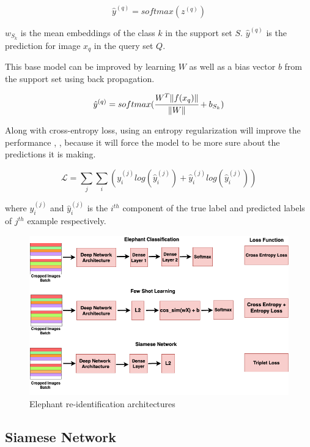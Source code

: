 \documentclass[10pt,twocolumn,letterpaper]{article}
\begin{document}
$$
\hat{y}^{(q)} = softmax(z^{(q)})
$$

$w_{S_k}$ is the mean embeddings of the class $k$ in the support set $S$. $\hat{y}^{(q)}$ is the prediction for image $x_q$ in the query set $Q$.

This base model can be improved by learning $W$ as well as a bias vector $b$ from the support set using back propagation. 

$$
\hat{y}^{(q)} = softmax(\cfrac{W^T \lVert f(x_q) \rVert}{\lVert W \rVert} + b_{S_k})
$$

Along with cross-entropy loss, using an entropy regularization will improve the performance \cite{fewshotlectures}, \cite{fewshotbaseline}, \cite{fewshotmetabaseline} because it will force the model to be more sure about the predictions it is making.

$$
\mathcal{L} = \sum_{j}\sum_{i} (y_i^{(j)} log(\hat{y}_i^{(j)}) + \hat{y}_i^{(j)} log({\hat{y}_i^{(j)}}))
$$

where $y_i^{(j)}$ and $\hat{y}_i^{(j)}$ is the $i^{th}$ component of the true label and predicted labels of $j^{th}$ example respectively.


\begin{figure}[t]
  \centering
  \includegraphics[scale=0.275]{reidentification_network}
   \caption{Elephant re-identification architectures}
   \label{fig:reidentification_network}
\end{figure}

\subsection{Siamese Network}
\end{document}
